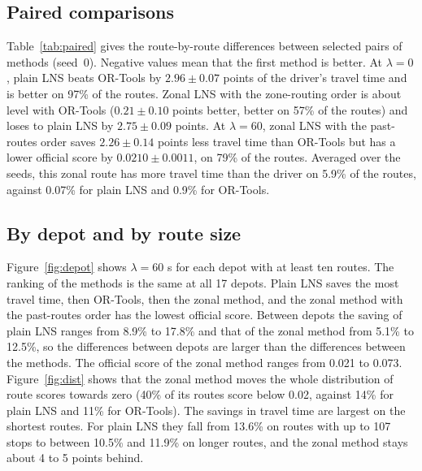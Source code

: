 \documentclass[11pt,a4paper]{article}
\begin{document}
\subsection{Paired comparisons}\label{sec:paired}
Table~\ref{tab:paired} gives the route-by-route differences between selected pairs of methods (seed~0). Negative values mean that the first method is better. At $\lambda=0$, plain LNS beats OR-Tools by $2.96\pm0.07$ points of the driver's travel time and is better on 97\% of the routes. Zonal LNS with the zone-routing order is about level with OR-Tools ($0.21\pm0.10$ points better, better on 57\% of the routes) and loses to plain LNS by $2.75\pm0.09$ points. At $\lambda=60$, zonal LNS with the past-routes order saves $2.26\pm0.14$ points less travel time than OR-Tools but has a lower official score by $0.0210\pm0.0011$, on 79\% of the routes. Averaged over the seeds, this zonal route has more travel time than the driver on 5.9\% of the routes, against 0.07\% for plain LNS and 0.9\% for OR-Tools.

\begin{table}[t]
\centering\small
\caption{Paired differences on the evaluation routes, seed 0 (first method minus second, negative means the first method is better). The last column is the share of routes on which the first method is better.}\label{tab:paired}

\end{table}

\subsection{By depot and by route size}\label{sec:depot}
Figure~\ref{fig:depot} shows $\lambda=60$ s for each depot with at least ten routes. The ranking of the methods is the same at all 17 depots. Plain LNS saves the most travel time, then OR-Tools, then the zonal method, and the zonal method with the past-routes order has the lowest official score. Between depots the saving of plain LNS ranges from 8.9\% to 17.8\% and that of the zonal method from 5.1\% to 12.5\%, so the differences between depots are larger than the differences between the methods. The official score of the zonal method ranges from 0.021 to 0.073. Figure~\ref{fig:dist} shows that the zonal method moves the whole distribution of route scores towards zero (40\% of its routes score below 0.02, against 14\% for plain LNS and 11\% for OR-Tools). The savings in travel time are largest on the shortest routes. For plain LNS they fall from 13.6\% on routes with up to 107 stops to between 10.5\% and 11.9\% on longer routes, and the zonal method stays about 4 to 5 points behind.
\end{document}
